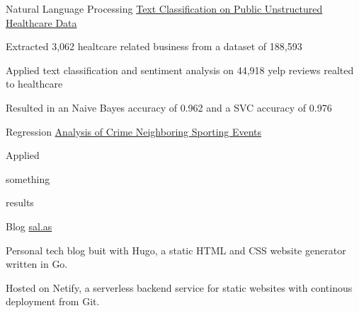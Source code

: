 

\begin{cventries}

  \cventrynodate
    {Natural Language Processing} %
    {\href{https://github.com/franksalas/text_classification_public_healthcare_data}{Text Classification on Public Unstructured Healthcare Data
        }
    }
    {} %
    {}
    {
      \begin{cvitems} %
        \item {Extracted 3,062 healtcare related business from a dataset of 188,593}
        \item {Applied text classification and sentiment analysis on  44,918 yelp reviews realted to healthcare}
        \item {Resulted in an Naive Bayes accuracy of 0.962 and a SVC accuracy of 0.976}
      \end{cvitems}
    }



  \cventrynodate
    {Regression} %
    {\href{https://github.com/franksalas/SpringboardCapstone}{Analysis of Crime Neighboring Sporting Events}} %
    {} %
    {} %
    {
      \begin{cvitems} %
        \item {Applied}
        \item {something}
        \item {results}
      \end{cvitems}
    }

  \cventrynodate
    {Blog} %
    {\href{https://github.com/franksalas/blog}{sal.as}} %
    {} %
    {} %
    {
      \begin{cvitems} %
        \item {Personal tech blog buit with Hugo, a static HTML and CSS website generator written in Go.}
        \item {Hosted on Netify, a serverless backend service for static websites with continous deployment from Git.}
      \end{cvitems}
    }

\end{cventries}
